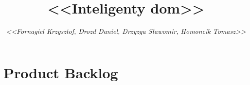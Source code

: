\documentclass[a4paper,12pt]{article}
\title{\bf{<<Inteligenty dom>>}}
\author{{\em <<Fornagiel Krzysztof, Drozd Daniel, Drzyzga Sławomir, Homoncik Tomasz>>}}
\date{}
\begin{document}
	
	\tableofcontents
	\thispagestyle{empty}
	
	
	
	\section{Product Backlog}
	
		

	
	
	
	
\end{document}

